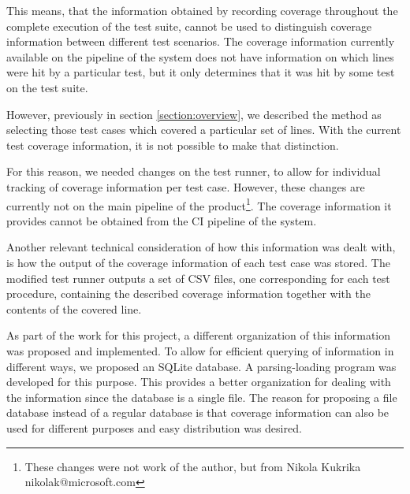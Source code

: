 \documentclass{article}
\begin{document}
This means, that the information obtained by recording coverage throughout the complete execution of the test suite, cannot be used to distinguish coverage information between different test scenarios. The coverage information currently available on the pipeline of the system does not have information on which lines were hit by a particular test, but it only determines that it was hit by some test on the test suite.

However, previously in section \ref{section:overview}, we described the method as selecting those test cases which covered a particular set of lines. With the current test coverage information, it is not possible to make that distinction.

For this reason, we needed changes on the test runner, to allow for individual tracking of coverage information per test case. However, these changes are currently not on the main pipeline of the product\footnote{These changes were not work of the author, but from Nikola Kukrika nikolak@microsoft.com}. The coverage information it provides cannot be obtained from the CI pipeline of the system.

Another relevant technical consideration of how this information was dealt with, is how the output of the coverage information of each test case was stored. The modified test runner outputs a set of CSV files, one corresponding for each test procedure, containing the described coverage information together with the contents of the covered line.

As part of the work for this project, a different organization of this information was proposed and implemented. To allow for efficient querying of information in different ways, we proposed an SQLite database. A parsing-loading program was developed for this purpose. This provides a better organization for dealing with the information since the database is a single file. The reason for proposing a file database instead of a regular database is that coverage information can also be used for different purposes and easy distribution was desired.
\end{document}
